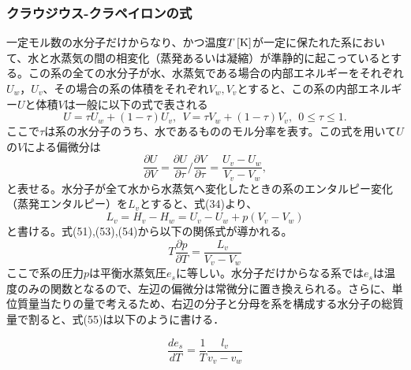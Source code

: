 \documentclass{jsarticle}
\begin{document}
\subsubsection{クラウジウス-クラペイロンの式}
一定モル数の水分子だけからなり、かつ温度$T\,[\rm{K}]$が一定に保たれた系において、水と水蒸気の間の相変化（蒸発あるいは凝縮）が準静的に起こっているとする。この系の全ての水分子が水、水蒸気である場合の内部エネルギーをそれぞれ$U_{w}，U_{v}$、その場合の系の体積をそれぞれ$V_{w}, V_{v}$とすると、この系の内部エネルギー$U$と体積$V$は一般に以下の式で表される
\begin{equation}
 U=\tau U_{w}+(1-\tau)U_{v},\ \ V=\tau V_{w}+(1-\tau)V_{v},\ \ 0 \le \tau \le 1.
\end{equation}
ここで$\tau$は系の水分子のうち、水であるもののモル分率を表す。この式を用いて$U$の$V$による偏微分は
\begin{equation}
 \frac{\partial U}{\partial V}=\frac{\partial U}{\partial \tau} {\bigg /} \frac{\partial V}{\partial \tau} = \frac{U_{v}-U_{w}}{V_{v}-V_{w}},
\end{equation}
と表せる。水分子が全て水から水蒸気へ変化したときの系のエンタルピー変化（蒸発エンタルピー）を$L_{v}$とすると、式(34)より、
\begin{equation}
 L_{v}=H_{v}-H_{w}=U_{v}-U_{w}+p(V_{v}-V_{w})
\end{equation}
と書ける。式(51),(53),(54)から以下の関係式が導かれる。
\begin{equation}
 T \frac{\partial p}{\partial T}=\frac{L_{v}}{V_{v}-V_{w}}
\end{equation}
ここで系の圧力$p$は平衡水蒸気圧$e_{s}$に等しい。水分子だけからなる系では$e_{s}$は温度のみの関数となるので、左辺の偏微分は常微分に置き換えられる。さらに、単位質量当たりの量で考えるため、右辺の分子と分母を系を構成する水分子の総質量で割ると、式(55)は以下のように書ける．

\begin{equation}
 \frac{de_{s}}{dT}=\frac{1}{T}\frac{l_{v}}{v_{v}-v_{w}}
\end{equation}
\end{document}
